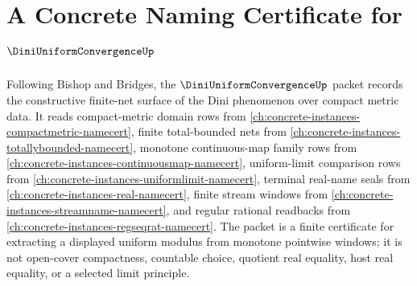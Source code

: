 \chapter{A Concrete Naming Certificate for $\DiniUniformConvergenceUp$}
\label{ch:concrete-instances-diniuniformconvergence-namecert}

Following Bishop and Bridges, the $\DiniUniformConvergenceUp$ packet records the constructive finite-net surface of the Dini phenomenon over compact metric data. It reads compact-metric domain rows from \autoref{ch:concrete-instances-compactmetric-namecert}, finite total-bounded nets from \autoref{ch:concrete-instances-totallybounded-namecert}, monotone continuous-map family rows from \autoref{ch:concrete-instances-continuousmap-namecert}, uniform-limit comparison rows from \autoref{ch:concrete-instances-uniformlimit-namecert}, terminal real-name seals from \autoref{ch:concrete-instances-real-namecert}, finite stream windows from \autoref{ch:concrete-instances-streamname-namecert}, and regular rational readbacks from \autoref{ch:concrete-instances-regseqrat-namecert}. The packet is a finite certificate for extracting a displayed uniform modulus from monotone pointwise windows; it is not open-cover compactness, countable choice, quotient real equality, host real equality, or a selected limit principle.

